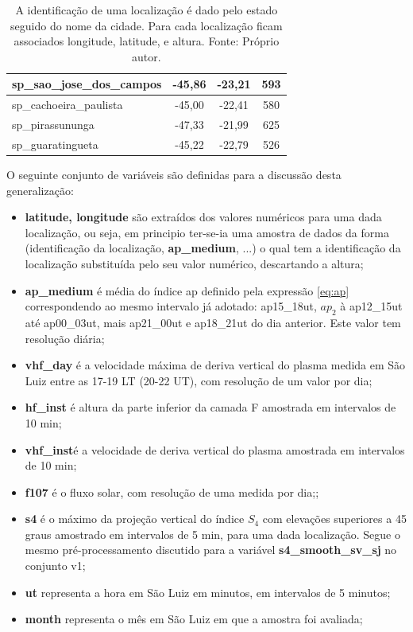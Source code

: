 \begin{table}[h]
\begin{center}
\begin{tabular}{|l|c|c|c|}
sp\_sao\_jose\_dos\_campos  & -45,86  & -23,21  & 593 \\ \hline
sp\_cachoeira\_paulista   & -45,00  & -22,41  & 580 \\ \hline
sp\_pirassununga         & -47,33  & -21,99  & 625 \\ \hline
sp\_guaratingueta        & -45,22  & -22,79  & 526 \\ \hline
\end{tabular}
\end{center}
\vspace{12pt}
\caption{A identificação de uma localização é dado pelo estado seguido do nome da cidade. Para cada localização ficam associados longitude, latitude, e altura. Fonte: Próprio autor.}
\label{tab:stations}
\end{table}

O seguinte conjunto de variáveis são definidas para a discussão desta generalização:

\begin{itemize}
\item {\bf latitude, longitude} são extraídos dos valores numéricos para uma dada localização, ou seja, em principio ter-se-ia uma amostra de dados da forma (identificação da localização, {\bf ap\_medium}, ...) o qual tem a identificação da localização substituída pelo seu valor numérico, descartando a altura;
\item {\bf ap\_medium} é  média do índice ap definido pela expressão \ref{eq:ap} correspondendo ao mesmo intervalo já adotado: ap15\_18ut, $ap_2$ à ap12\_15ut até ap00\_03ut, mais ap21\_00ut e ap18\_21ut do dia anterior. Este valor tem resolução diária;
\item {\bf vhf\_day} é a velocidade máxima de deriva vertical do plasma medida em São Luiz entre as 17-19 LT (20-22 UT), com resolução de um valor por dia;
\item {\bf hf\_inst} é altura da parte inferior da camada F amostrada em intervalos de 10 min;
\item {\bf vhf\_inst}é a velocidade de deriva vertical do plasma amostrada em intervalos de 10 min;
\item {\bf f107}  é o fluxo solar, com resolução de uma medida por dia;;
\item {\bf s4} é o máximo da projeção vertical do índice $S_4$ com elevações superiores a 45 graus amostrado em intervalos de 5 min, para uma dada localização. Segue o mesmo pré-processamento discutido para a variável {\bf s4\_smooth\_sv\_sj} no conjunto v1;
\item {\bf ut} representa a hora em São Luiz em minutos, em intervalos de 5 minutos;
\item {\bf month} representa o mês em São Luiz em que a amostra foi avaliada;
\end{itemize}

